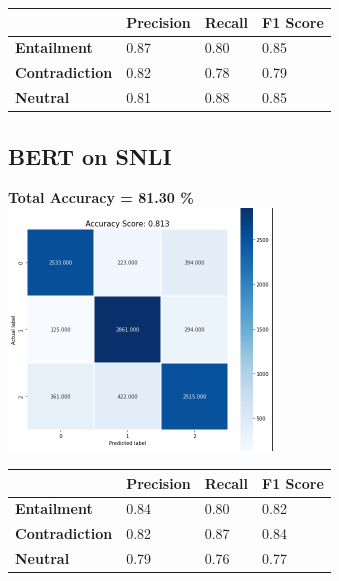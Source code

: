\documentclass[12pt, conference]{IEEEtran}
\begin{document}
\begin{table}[h]
\begin{tabular}{|l|l|l|l|}
\hline
                       & \textbf{Precision} & \textbf{Recall} & \textbf{F1 Score} \\ \hline
\textbf{Entailment}    & 0.87               & 0.80            & 0.85              \\ \hline
\textbf{Contradiction} & 0.82               & 0.78            & 0.79              \\ \hline
\textbf{Neutral}       & 0.81               & 0.88            & 0.85              \\ \hline
\end{tabular}
\end{table}

\subsection{BERT on SNLI}
\textbf{Total Accuracy = 81.30 \%}\\
\includegraphics[width=7cm]{images/results/SNLIbert.png}

\begin{table}[h]
\begin{tabular}{|l|l|l|l|}
\hline
                       & \textbf{Precision} & \textbf{Recall} & \textbf{F1 Score} \\ \hline
\textbf{Entailment}    & 0.84               & 0.80            & 0.82              \\ \hline
\textbf{Contradiction} & 0.82               & 0.87            & 0.84              \\ \hline
\textbf{Neutral}       & 0.79               & 0.76            & 0.77              \\ \hline
\end{tabular}
\end{table}
\end{document}
